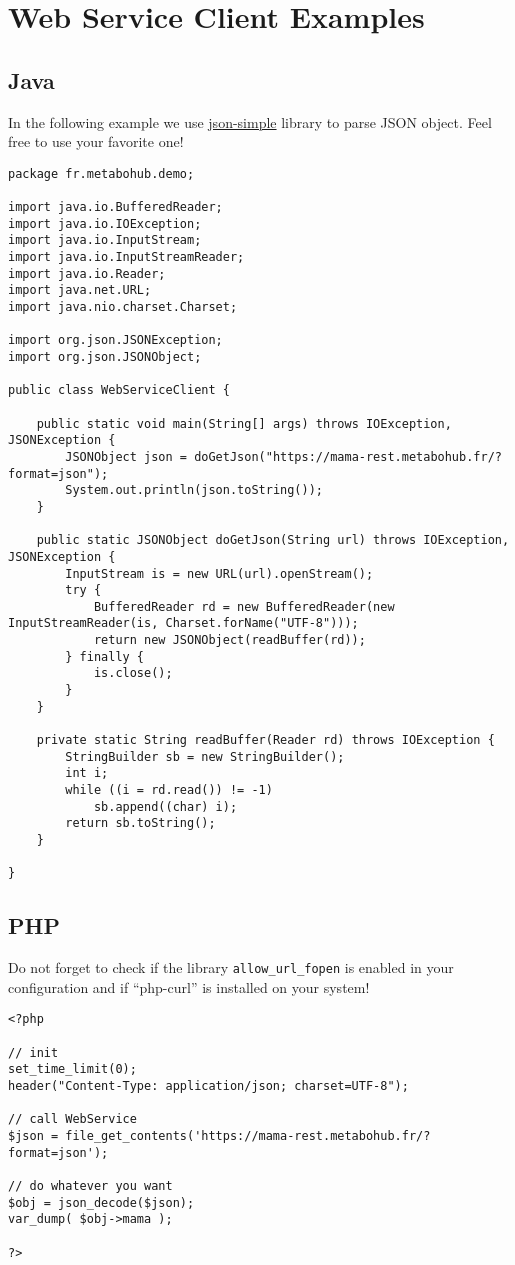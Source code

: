 \section{Web Service Client Examples}

\subsection{Java}
\hspace*{\parindent}
In the following example we use \href{https://code.google.com/p/json-simple/}{json-simple} library to parse JSON object. 
Feel free to use your favorite one!

\begin{lstlisting}[language=customJava,caption={Java request}]
package fr.metabohub.demo;

import java.io.BufferedReader;
import java.io.IOException;
import java.io.InputStream;
import java.io.InputStreamReader;
import java.io.Reader;
import java.net.URL;
import java.nio.charset.Charset;

import org.json.JSONException;
import org.json.JSONObject;

public class WebServiceClient {

	public static void main(String[] args) throws IOException, JSONException {
		JSONObject json = doGetJson("https://mama-rest.metabohub.fr/?format=json");
		System.out.println(json.toString());
	}

	public static JSONObject doGetJson(String url) throws IOException, JSONException {
		InputStream is = new URL(url).openStream();
		try {
			BufferedReader rd = new BufferedReader(new InputStreamReader(is, Charset.forName("UTF-8")));
			return new JSONObject(readBuffer(rd));
		} finally {
			is.close();
		}
	}

	private static String readBuffer(Reader rd) throws IOException {
		StringBuilder sb = new StringBuilder();
		int i;
		while ((i = rd.read()) != -1)
			sb.append((char) i);
		return sb.toString();
	}
	
}
\end{lstlisting}

\subsection{PHP}
\hspace*{\parindent}
Do not forget to check if the library \texttt{allow\_url\_fopen} is enabled in your configuration and if ``php-curl'' is installed on your system! 
\begin{lstlisting}[language=customPHP,caption={PHP request}]
<?php

// init
set_time_limit(0);
header("Content-Type: application/json; charset=UTF-8");

// call WebService
$json = file_get_contents('https://mama-rest.metabohub.fr/?format=json');

// do whatever you want
$obj = json_decode($json);
var_dump( $obj->mama );

?>
\end{lstlisting}

